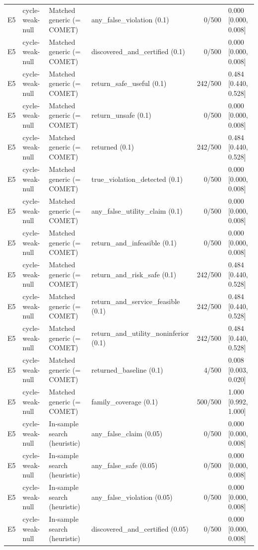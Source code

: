 \begin{longtable}{p{.04\linewidth}p{.18\linewidth}p{.19\linewidth}p{.16\linewidth}r p{.21\linewidth}}
E5 & cycle-weak-null & Matched generic (= COMET) & any\_false\_violation (0.1) & 0/500 & 0.000 [0.000, 0.008]\\
E5 & cycle-weak-null & Matched generic (= COMET) & discovered\_and\_certified (0.1) & 0/500 & 0.000 [0.000, 0.008]\\
E5 & cycle-weak-null & Matched generic (= COMET) & return\_safe\_useful (0.1) & 242/500 & 0.484 [0.440, 0.528]\\
E5 & cycle-weak-null & Matched generic (= COMET) & return\_unsafe (0.1) & 0/500 & 0.000 [0.000, 0.008]\\
E5 & cycle-weak-null & Matched generic (= COMET) & returned (0.1) & 242/500 & 0.484 [0.440, 0.528]\\
E5 & cycle-weak-null & Matched generic (= COMET) & true\_violation\_detected (0.1) & 0/500 & 0.000 [0.000, 0.008]\\
E5 & cycle-weak-null & Matched generic (= COMET) & any\_false\_utility\_claim (0.1) & 0/500 & 0.000 [0.000, 0.008]\\
E5 & cycle-weak-null & Matched generic (= COMET) & return\_and\_infeasible (0.1) & 0/500 & 0.000 [0.000, 0.008]\\
E5 & cycle-weak-null & Matched generic (= COMET) & return\_and\_risk\_safe (0.1) & 242/500 & 0.484 [0.440, 0.528]\\
E5 & cycle-weak-null & Matched generic (= COMET) & return\_and\_service\_feasible (0.1) & 242/500 & 0.484 [0.440, 0.528]\\
E5 & cycle-weak-null & Matched generic (= COMET) & return\_and\_utility\_noninferior (0.1) & 242/500 & 0.484 [0.440, 0.528]\\
E5 & cycle-weak-null & Matched generic (= COMET) & returned\_baseline (0.1) & 4/500 & 0.008 [0.003, 0.020]\\
E5 & cycle-weak-null & Matched generic (= COMET) & family\_coverage (0.1) & 500/500 & 1.000 [0.992, 1.000]\\
E5 & cycle-weak-null & In-sample search (heuristic) & any\_false\_claim (0.05) & 0/500 & 0.000 [0.000, 0.008]\\
E5 & cycle-weak-null & In-sample search (heuristic) & any\_false\_safe (0.05) & 0/500 & 0.000 [0.000, 0.008]\\
E5 & cycle-weak-null & In-sample search (heuristic) & any\_false\_violation (0.05) & 0/500 & 0.000 [0.000, 0.008]\\
E5 & cycle-weak-null & In-sample search (heuristic) & discovered\_and\_certified (0.05) & 0/500 & 0.000 [0.000, 0.008]\\

\end{longtable}
